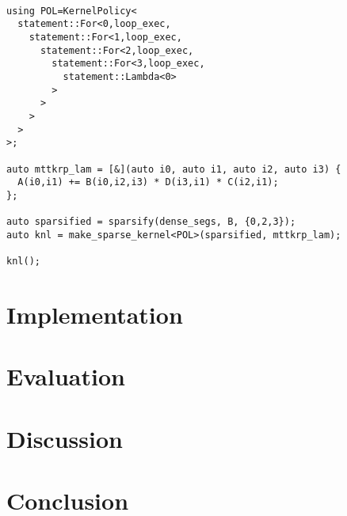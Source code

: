 \begin{lstlisting}

using POL=KernelPolicy<
  statement::For<0,loop_exec,
    statement::For<1,loop_exec,
      statement::For<2,loop_exec,
        statement::For<3,loop_exec,
          statement::Lambda<0>
        >
      >
    >
  >
>;

auto mttkrp_lam = [&](auto i0, auto i1, auto i2, auto i3) {
  A(i0,i1) += B(i0,i2,i3) * D(i3,i1) * C(i2,i1);
};

auto sparsified = sparsify(dense_segs, B, {0,2,3});
auto knl = make_sparse_kernel<POL>(sparsified, mttkrp_lam);

knl();
\end{lstlisting}



\section{Implementation}

\section{Evaluation}

\section{Discussion}
\section{Conclusion}